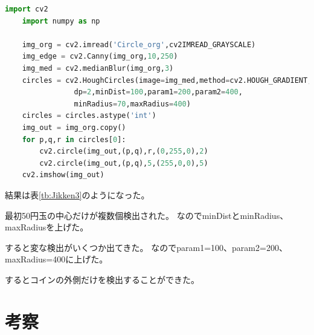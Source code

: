 \documentclass{jlreq}
\begin{document}
\begin{lstlisting}[caption={円検出},language=Python,label=src:CircleCode]
	import cv2
	import numpy as np

	img_org = cv2.imread('Circle_org',cv2IMREAD_GRAYSCALE)
	img_edge = cv2.Canny(img_org,10,250)
	img_med = cv2.medianBlur(img_org,3)
	circles = cv2.HoughCircles(image=img_med,method=cv2.HOUGH_GRADIENT,
				dp=2,minDist=100,param1=200,param2=400,
				minRadius=70,maxRadius=400)
	circles = circles.astype('int')
	img_out = img_org.copy()
	for p,q,r in circles[0]:
		cv2.circle(img_out,(p,q),r,(0,255,0),2)
		cv2.circle(img_out,(p,q),5,(255,0,0),5)
	cv2.imshow(img_out)
\end{lstlisting}

結果は表\ref{tb:Jikken3}のようになった。
\begin{table}[htbp]
	\centering
	\caption{実験3の結果}
\end{table}

最初50円玉の中心だけが複数個検出された。
なのでminDistとminRadius、maxRadiusを上げた。

すると変な検出がいくつか出てきた。
なのでparam1=100、param2=200、maxRadius=400に上げた。

するとコインの外側だけを検出することができた。

\section{考察}
\end{document}
